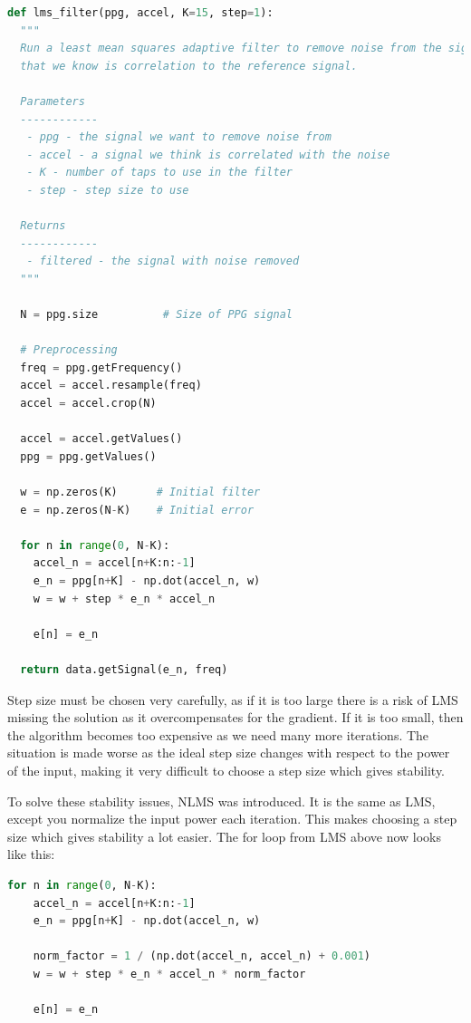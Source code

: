 \documentclass[12pt,a4paper,twoside,openright]{report}
\begin{document}
\begin{lstlisting}[language=Python]
def lms_filter(ppg, accel, K=15, step=1):
  """
  Run a least mean squares adaptive filter to remove noise from the signal
  that we know is correlation to the reference signal.

  Parameters
  ------------
   - ppg - the signal we want to remove noise from
   - accel - a signal we think is correlated with the noise
   - K - number of taps to use in the filter
   - step - step size to use

  Returns
  ------------
   - filtered - the signal with noise removed
  """

  N = ppg.size          # Size of PPG signal

  # Preprocessing
  freq = ppg.getFrequency()
  accel = accel.resample(freq)
  accel = accel.crop(N)

  accel = accel.getValues()
  ppg = ppg.getValues()

  w = np.zeros(K)      # Initial filter
  e = np.zeros(N-K)    # Initial error

  for n in range(0, N-K):
    accel_n = accel[n+K:n:-1]
    e_n = ppg[n+K] - np.dot(accel_n, w)          
    w = w + step * e_n * accel_n

    e[n] = e_n

  return data.getSignal(e_n, freq)
\end{lstlisting}

Step size must be chosen very carefully, as if it is too large there is a risk
of LMS missing the solution as it overcompensates for the gradient. If it is
too small, then the algorithm becomes too expensive as we need many more
iterations. The situation is made worse as the ideal step size changes with
respect to the power of the input, making it very difficult to choose a step
size which gives stability.

To solve these stability issues, NLMS was introduced. It is the same as LMS, 
except you normalize the input power each
iteration. This makes choosing a step size which gives stability a lot easier.
The for loop from LMS above now looks like this:

\begin{lstlisting}[language=Python]
for n in range(0, N-K):
	accel_n = accel[n+K:n:-1]
	e_n = ppg[n+K] - np.dot(accel_n, w)          

	norm_factor = 1 / (np.dot(accel_n, accel_n) + 0.001)
	w = w + step * e_n * accel_n * norm_factor

	e[n] = e_n
\end{lstlisting}
\end{document}
